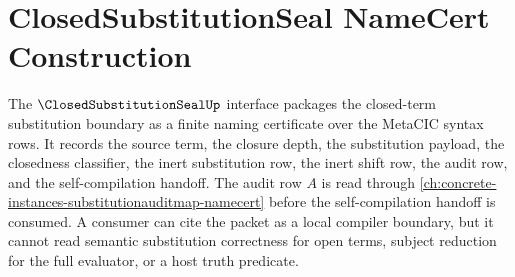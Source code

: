 \chapter{ClosedSubstitutionSeal NameCert Construction}
\label{ch:concrete-instances-closedsubstitutionseal-namecert}

The $\ClosedSubstitutionSealUp$ interface packages the closed-term substitution boundary as a finite naming certificate over the MetaCIC syntax rows. It records the source term, the closure depth, the substitution payload, the closedness classifier, the inert substitution row, the inert shift row, the audit row, and the self-compilation handoff. The audit row $A$ is read through \autoref{ch:concrete-instances-substitutionauditmap-namecert} before the self-compilation handoff is consumed. A consumer can cite the packet as a local compiler boundary, but it cannot read semantic substitution correctness for open terms, subject reduction for the full evaluator, or a host truth predicate.

